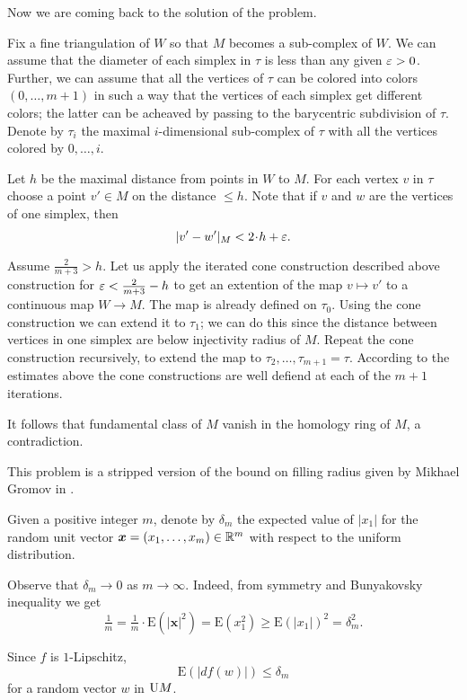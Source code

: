 \medskip

Now we are coming back to the solution of the problem.

Fix a fine triangulation of $W$ so that $M$ becomes a sub-complex of $W$.
We can assume that the diameter of each simplex in $\tau$ is less than any given
$\varepsilon>0$.
Further, we can assume that all the vertices of $\tau$ can be colored into colors $(0,\dots, m+1)$
in such a way that the vertices of each simplex 
get different colors;
the latter can be acheaved by passing to the barycentric subdivision of $\tau$.
Denote by $\tau_i$ the maximal $i$-dimensional sub-complex of $\tau$ 
with all the vertices colored by $0,\dots, i$.

Let $h$ be the maximal distance from points in $W$ to $M$.
For each vertex $v$ in $\tau$ 
choose a point $v'\in M$ on the distance $\le h$.
Note that 
if $v$ and $w$ are the vertices of one simplex,
then
\[|v'-w'|_M<2\cdot h+\eps.\]

Assume $\tfrac{2}{m+3}>h$.
Let us apply the iterated cone construction described above construction for $\varepsilon<\tfrac{2}{m+3}-h$ to get an extention of the map $v\mapsto v'$ 
to a continuous 
map $W\to M$.
The map is already defined on $\tau_0$.
Using the cone construction we can extend it to $\tau_1$;
we can do this since the distance between vertices in one simplex are below injectivity radius of $M$.
Repeat the cone construction recursively, to extend the map to $\tau_2,\dots,\tau_{m+1}=\tau$.
According to the estimates above the cone constructions are well defiend at each of the $m+1$ iterations.

It follows that fundamental class of $M$ vanish in the homology ring of $M$, 
a contradiction. 
\qeds


This problem is a stripped version of the bound on filling radius given by Mikhael Gromov in \cite{gromov-filling}.  

Given a positive integer $m$,
denote by $\delta_m$ 
the expected value of $|x_1|$ for the random unit vector 
$\bm{x}\z=(x_1,\dots,x_m)\z\in\RR^m$ 
with respect to the uniform distribution.

Observe that $\delta_m\to 0$ as $m\to\infty$.
Indeed, from symmetry and Bunyakovsky inequality we get
\[
\tfrac1m=\tfrac1m\cdot\mathrm{E}(|\bm{x}|^2)
=\mathrm{E}(x_1^2)\ge \mathrm{E}(|x_1|)^2=\delta_m^2.
\]

Since $f$ is $1$-Lipschitz,
\[\mathrm{E}(|df(w)|)\le\delta_m\]
for a random vector $w$ in $\mathrm{U} M$.


